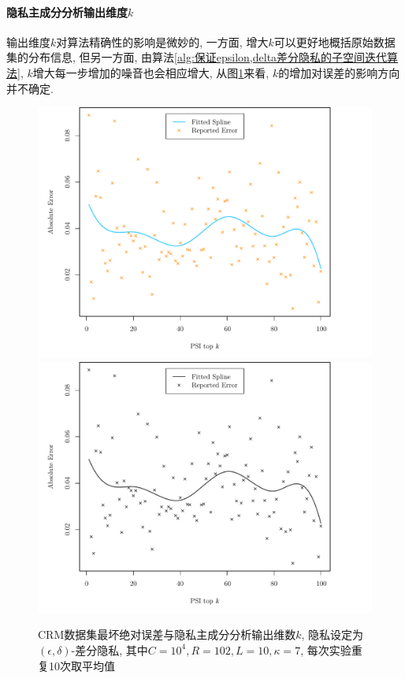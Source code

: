 \paragraph{隐私主成分分析输出维度$k$} %
\label{par:隐私主成分分析输出维度_k_}
输出维度$k$对算法精确性的影响是微妙的, 一方面, 增大$k$可以更好地概括原始数据集的分布信息, 但另一方面, 由算法\ref{alg:保证epsilon,delta差分隐私的子空间迭代算法}, $k$增大每一步增加的噪音也会相应增大, 从图\ref{fig:CRM数据集最坏绝对误差与隐私主成分分析输出维数_k}来看, $k$的增加对误差的影响方向并不确定. 
\begin{figure}[hbtp]\centering
  \caption{CRM数据集最坏绝对误差与隐私主成分分析输出维数$k$, 隐私设定为$(\epsilon, \delta)$-差分隐私, 其中$C=10^4, R = 102, L = 10, \kappa = 7$, 每次实验重复10次取平均值 }\label{fig:CRM数据集最坏绝对误差与隐私主成分分析输出维数_k}
  \makeatletter
  \ifHy@colorlinks
  \includegraphics[width=140mm]{fig/fig_CRM.pdf}
  \else
  \includegraphics[width=140mm]{fig/fig_CRM_bw.pdf}
  \fi
  \makeatother
\end{figure}
